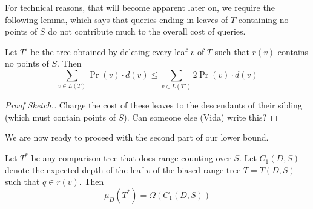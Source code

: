\documentclass[lotsofwhite,charterfonts]{patmorin}
\newcommand{\depth}{d}
\newcommand{\leaves}{L}
\begin{document}
For technical reasons, that will become apparent later on, we require
the following lemma, which says that queries ending in leaves of $T$
containing no points of $S$ do not contribute much to the overall cost
of queries.

\begin{lem}
Let $T'$ be the tree obtained by deleting every leaf $v$ of $T$ such
that $r(v)$ contains no points of $S$.  Then
\[
  \sum_{v\in\leaves(T)} \Pr(v) \cdot \depth(v)
    \le \sum_{v\in\leaves(T')} 2\Pr(v) \cdot \depth(v)
\]
\end{lem}

\begin{proof}[Proof Sketch.]
Charge the cost of these leaves to the descendants of their sibling
(which must contain points of $S$).  Can someone else (Vida) write
this?
\end{proof}

We are now ready to proceed with the second part of our lower bound.

\begin{lem}
Let $T^*$ be any comparison tree that does range counting over $S$. Let
$C_1(D,S)$ denote the expected depth of the leaf $v$ of the biased
range tree $T=T(D,S)$ such that $q\in r(v)$.  Then
\[
    \mu_D(T^*) = \Omega(C_1(D,S))
\]
\end{lem}
\end{document}
